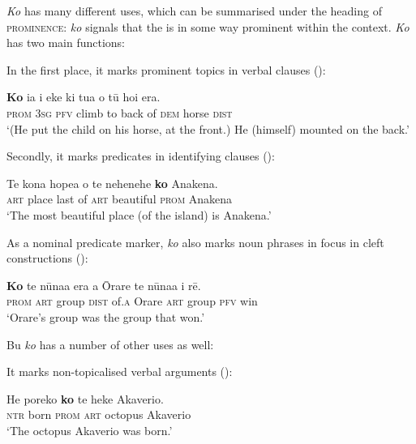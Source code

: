 \textit{Ko} has many different uses, which can be summarised under the heading of \textsc{prominence}: \textit{ko} signals that the  is in some way prominent within the context. \textit{Ko} has two main functions:

In the first place, it marks prominent topics in verbal clauses ():

\ea\label{ex:4.311}
\gll \textbf{Ko} ia i eke ki tu{\ꞌ}a o tū hoi era.\\
\textsc{prom} \textsc{3sg} \textsc{pfv} climb to back of \textsc{dem} horse \textsc{dist}\\

\glt
‘(He put the child on his horse, at the front.) He (himself) mounted on the back.’ \textstyleExampleref{[R399.046]} 
\z

Secondly, it marks predicates in identifying clauses (): 

\ea\label{ex:4.312}
\gll Te kona hope{\ꞌ}a o te nehenehe \textbf{ko} {\ꞌ}Anakena. \\
\textsc{art} place last of \textsc{art} beautiful \textsc{prom} Anakena \\

\glt
‘The most beautiful place (of the island) is Anakena.’ \textstyleExampleref{[R350.013]} 
\z

As a nominal predicate marker, \textit{ko} also marks noun phrases in focus in cleft constructions ():

\ea\label{ex:4.313}
\gll \textbf{Ko} te nūna{\ꞌ}a era {\ꞌ}a {\ꞌ}Ōrare te nūna{\ꞌ}a i rē. \\
\textsc{prom} \textsc{art} group \textsc{dist} of\textsc{.a} Orare \textsc{art} group \textsc{pfv} win \\

\glt
‘Orare’s group was the group that won.’ \textstyleExampleref{[R539-3.313]}
\z

Bu \textit{ko} has a number of other uses as well:

It marks non-topicalised verbal arguments ():

\ea\label{ex:4.314}
\gll He poreko \textbf{ko} te heke {\ꞌ}Akaverio. \\
\textsc{ntr} born \textsc{prom} \textsc{art} octopus Akaverio \\

\glt
‘The octopus Akaverio was born.’ \textstyleExampleref{[Mtx-7-14.003]}
\z

